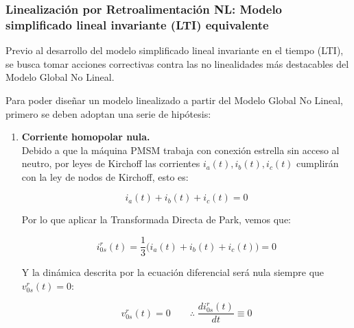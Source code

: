 \documentclass[blue,fullpaper]{ludusofficial}  %
\begin{document}
\subsubsection{ Linealización por Retroalimentación NL: Modelo simplificado lineal invariante (LTI)
equivalente}

Previo al desarrollo del modelo simplificado lineal invariante en el tiempo (LTI), se busca tomar acciones correctivas contra las no linealidades más destacables del Modelo Global No Lineal.

Para poder diseñar un modelo linealizado a partir del Modelo Global No Lineal, primero se deben adoptan una serie de hipótesis:

\begin{enumerate}
    \item \textbf{Corriente homopolar nula.} \\
    Debido a que la máquina PMSM trabaja con conexión estrella sin acceso al neutro, por leyes de Kirchoff las corrientes \(i_a(t), i_b(t), i_c(t)\) cumplirán con la ley de nodos de Kirchoff, esto es:

    \begin{equation}
        i_a(t) + i_b(t) + i_c(t) = 0 
    \end{equation}

    Por lo que aplicar la Transformada Directa de Park, vemos que:

    \begin{equation}
        i_{0s}^{r}(t) = \frac{1}{3} \Big(  i_a(t) + i_b(t) + i_c(t)  \Big) = 0 
    \end{equation}
    
    Y la dinámica descrita por la ecuación diferencial será nula siempre que \(v_{0s}^{r}(t) = 0\):

    \begin{equation}
        v_{0s}^{r}(t) = 0 \qquad \therefore \; \frac{di_{0s}^{r}(t)}{dt}   \equiv 0   
    \end{equation}
    


\end{enumerate}
\end{document}
